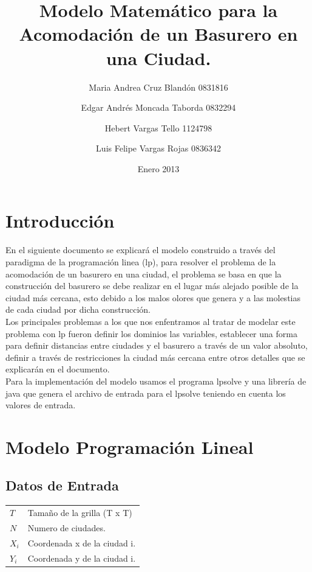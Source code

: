 \documentclass[10pt]{article}
\title{ \textbf{Modelo Matemático para la Acomodación de un Basurero en una Ciudad.}}
\author{Maria Andrea Cruz Blandón 0831816 \and Edgar Andrés Moncada  Taborda 0832294 \and Hebert Vargas Tello 1124798 \and Luis Felipe Vargas Rojas 0836342  }
\date{Enero 2013}
\begin{document}
\maketitle

\tableofcontents

\newpage

\section{Introducci\'on}
En el siguiente documento se explicará el modelo construido a través del paradigma de la programación linea (lp), para resolver el problema de la acomodación de un basurero en una ciudad, el problema se basa en que la construcci\'on del basurero se debe realizar en el lugar  m\'as alejado posible de la ciudad más cercana, esto debido a los malos olores que genera y a las molestias de cada ciudad por dicha construcción.\\

Los principales problemas a los que nos enfentramos al tratar de modelar este problema con lp fueron  definir los dominios las variables, establecer una forma para definir distancias entre ciudades y el basurero a trav\'es de un valor absoluto, definir a través de restricciones la ciudad m\'as cercana entre otros detalles que se explicarán en el documento.\\

Para la implementación del modelo usamos el programa lpsolve y una librería de java que genera el archivo de entrada para el lpsolve teniendo en cuenta los valores de entrada.

\section{Modelo Programaci\'on Lineal} 

\subsection{Datos de Entrada}
\begin{tabular}{l l }
$T$ & Tamaño de la grilla (T x T)\\
$N$ & Numero de ciudades.\\ 
$X_i$ & Coordenada x de la ciudad i. \\
$Y_i$ & Coordenada y de la ciudad i. \\

\end{tabular}
\end{document}
